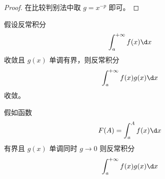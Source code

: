 \begin{proof}
	在比较判别法中取 $g = x^{-p}$ 即可。
\end{proof}

\begin{theorem}
	假设反常积分
	\[ \int_{a}^{+\infty} f(x) \d x \]
	收敛且 $g(x)$ 单调有界，则反常积分
	\[ \int_{a}^{+\infty} f(x) g(x) \d x \]
	收敛。
\end{theorem}

\begin{theorem}
	假如函数
	\[ F(A) = \int_{a}^{A} f(x) \d x \]
	有界且 $g(x)$ 单调同时 $g \to 0$ 则反常积分
	\[ \int_{a}^{+\infty} f(x) g(x) \d x \]
\end{theorem}
